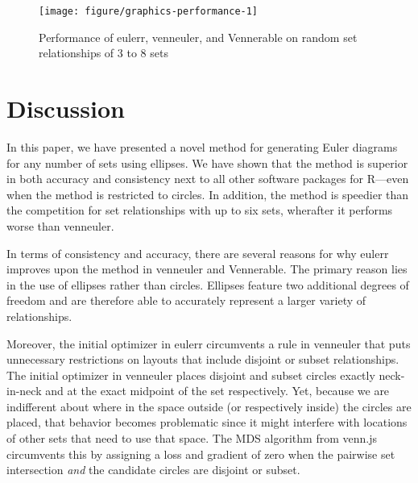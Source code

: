 \documentclass[
  a4paper,
  nofonts,
  nobib,
  nohyper,
  openany
]{tufte-book}\usepackage[]{graphicx}\usepackage[]{color}
\newenvironment{knitrout}{}{} %
\newcommand{\pkg}[1]{{\fontseries{b}\selectfont #1}}
\begin{document}
\begin{figure}[hbt]
\begin{knitrout}
\color{fgcolor}

{\centering \texttt{[image: figure/graphics-performance-1]} 

}



\end{knitrout}
\caption{Performance of \pkg{eulerr}, \pkg{venneuler}, and \pkg{Vennerable} on random set relationships of 3 to 8 sets }
\label{fig:performance}
\end{figure}

\chapter{Discussion}
\label{sec:discussion}

In this paper, we have presented a novel method for generating Euler diagrams for any number of sets using ellipses. We have shown that the method is superior in both accuracy and consistency next to all other software packages for R---even when the method is restricted to circles. In addition, the method is speedier than the competition for set relationships with up to six sets, wherafter it performs worse than \pkg{venneuler}.

In terms of consistency and accuracy, there are several reasons for why \pkg{eulerr} improves upon the method in \pkg{venneuler} and \pkg{Vennerable}. The primary reason lies in the use of ellipses rather than circles. Ellipses feature two additional degrees of freedom and are therefore able to accurately represent a larger variety of relationships.

Moreover, the initial optimizer in \pkg{eulerr} circumvents a rule in \pkg{venneuler} that puts unnecessary restrictions on layouts that include disjoint or subset relationships. The initial optimizer in venneuler places disjoint and subset circles exactly neck-in-neck and at the exact midpoint of the set respectively. Yet, because we are indifferent about where in the space outside (or respectively inside) the circles are placed, that behavior becomes problematic since it might interfere with locations of other sets that need to use that space. The MDS algorithm from \pkg{venn.js} circumvents this by assigning a loss and gradient of zero when the pairwise set intersection \emph{and} the candidate circles are disjoint or subset.
\end{document}

